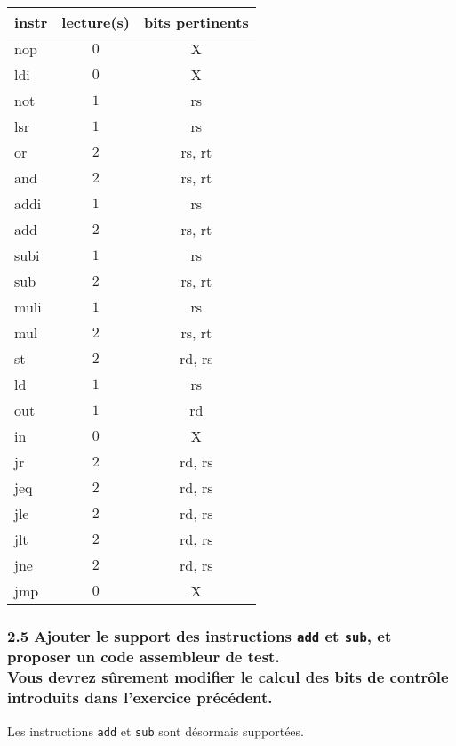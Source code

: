 \documentclass[twoside, 12pt, a4paper]{article}
\begin{document}
\begin{center}
	\ttfamily
	\begin{tabular}{|l|c|c|}
		\hline
		instr    & lecture(s) & bits pertinents \\
		\hline
		nop		&  $0$          & X \\
		ldi		&  $0$          & X \\
		\hline
		not		&  $1$          & rs \\
		lsr		&  $1$          & rs \\
		or		&  $2$          & rs, rt \\
		and		&  $2$          & rs, rt \\
		\hline
		addi	&  $1$          & rs \\
		add		&  $2$          & rs, rt \\
		subi	&  $1$          & rs \\
		sub		&  $2$          & rs, rt \\
		\hline
		muli	&  $1$          & rs \\
		mul		&  $2$          & rs, rt \\
		\hline
		st		&  $2$          & rd, rs \\
		ld		&  $1$          & rs \\
		out		&  $1$          & rd \\
		in		&  $0$          & X \\
		\hline
		jr		&  $2$          & rd, rs \\
		\hline
		jeq		&  $2$          & rd, rs \\
		jle		&  $2$          & rd, rs \\
		jlt		&  $2$          & rd, rs \\
		jne		&  $2$          & rd, rs \\
		\hline
		jmp		&  $0$          & X \\
		\hline
	\end{tabular}
\end{center}

        \subsubsection*{\textbf{2.5} Ajouter le support des instructions \texttt{add} et \texttt{sub}, et proposer un code assembleur de test. \\
        Vous devrez sûrement modifier le calcul des bits de contrôle introduits dans l'exercice précédent.}

Les instructions \texttt{add} et \texttt{sub} sont désormais supportées.
\end{document}
